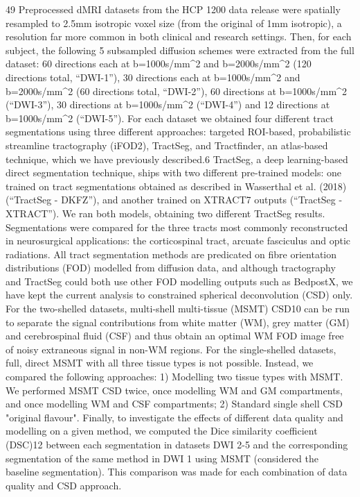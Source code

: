 49 Preprocessed dMRI datasets from the HCP 1200 data release were spatially resampled to 2.5mm isotropic voxel size (from the original of 1mm isotropic), a resolution far more common in both clinical and research settings.
Then, for each subject, the following 5 subsampled diffusion schemes were extracted from the full dataset: 60 directions each at b=1000s/mm^2 and b=2000s/mm^2 (120 directions total, “DWI-1”), 30 directions each at b=1000s/mm^2 and b=2000s/mm^2 (60 directions total, “DWI-2”), 60 directions at b=1000s/mm^2 (“DWI-3”), 30 directions at b=1000s/mm^2 (“DWI-4”) and 12 directions at b=1000s/mm^2 (“DWI-5”).
For each dataset we obtained four different tract segmentations using three different approaches: targeted ROI-based, probabilistic streamline tractography (iFOD2), TractSeg, and Tractfinder, an atlas-based technique, which we have previously described.6 TractSeg, a deep learning-based direct segmentation technique, ships with two different pre-trained models:
one trained on tract segmentations obtained as described in Wasserthal et al. (2018) (“TractSeg - DKFZ”), and another trained on XTRACT7 outputs (“TractSeg - XTRACT”). We ran both models, obtaining two different TractSeg results.
Segmentations were compared for the three tracts most commonly reconstructed in neurosurgical applications: the corticospinal tract, arcuate fasciculus and optic radiations.
All tract segmentation methods are predicated on fibre orientation distributions (FOD) modelled from diffusion data, and although tractography and TractSeg could both use other FOD modelling outputs such as BedpostX, we have kept the current analysis to constrained spherical deconvolution (CSD) only.
For the two-shelled datasets, multi-shell multi-tissue (MSMT) CSD10 can be run to separate the signal contributions from white matter (WM), grey matter (GM) and cerebrospinal fluid (CSF) and thus obtain an optimal WM FOD image free of noisy extraneous signal in non-WM regions.
For the single-shelled datasets, full, direct MSMT with all three tissue types is not possible.
Instead, we compared the following approaches: 1) Modelling two tissue types with MSMT.
We performed MSMT CSD twice, once modelling WM and GM compartments, and once modelling WM and CSF compartments; 2) Standard single shell CSD "original flavour".
Finally, to investigate the effects of different data quality and modelling on a given method, we computed the Dice similarity coefficient (DSC)12 between each segmentation in datasets DWI 2-5 and the corresponding segmentation of the same method in DWI 1 using MSMT (considered the baseline segmentation).
This comparison was made for each combination of data quality and CSD approach.

